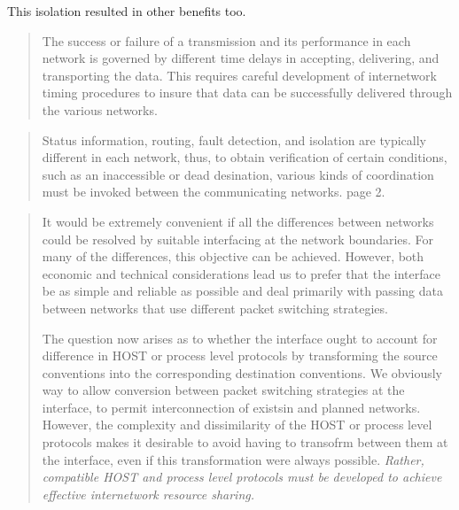 This isolation resulted in other benefits too. 

\begin{quote}
    The success or failure of a transmission and its performance in each network is governed by
    different time delays in accepting, delivering, and transporting the data. This requires careful
    development of internetwork timing procedures to insure that data can be successfully delivered
    through the various networks.
\end{quote}


%


\begin{quote}
Status information, routing, fault detection, and isolation are typically different in each
network, thus, to obtain verification of certain conditions, such as an inaccessible or dead
    desination, various kinds of coordination must be invoked between the communicating
    networks.\cite{cerf1974} page 2.
\end{quote}

\begin{quote}
It would be extremely convenient if all the differences between networks could be resolved by
suitable interfacing at the network boundaries. For many of the differences, this objective can be
achieved. However, both economic and technical considerations lead us to prefer that the
interface be as simple and reliable as possible and deal primarily with passing data between
networks that use different packet switching strategies.

The question now arises as to whether the interface ought to account for difference in HOST or
process level protocols by transforming the source conventions into the corresponding
destination conventions. We obviously way to allow conversion between packet switching
strategies at the interface, to permit interconnection of existsin and planned networks.
However, the complexity and dissimilarity of the HOST or process level protocols makes it
desirable to avoid having to transofrm between them at the interface, even if this
    transformation were always possible. \emph{Rather, compatible HOST and process level protocols
    must be developed to achieve effective internetwork resource sharing.}
\end{quote}

